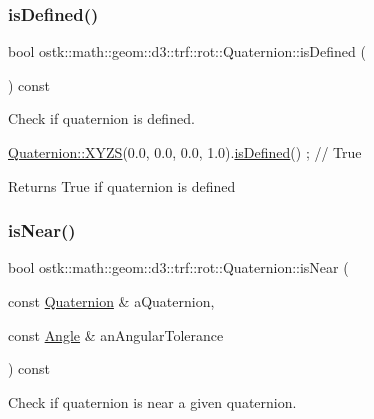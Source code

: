 \subsubsection{\texorpdfstring{is\+Defined()}{isDefined()}}
{\footnotesize\ttfamily bool ostk\+::math\+::geom\+::d3\+::trf\+::rot\+::\+Quaternion\+::is\+Defined (\begin{DoxyParamCaption}{ }\end{DoxyParamCaption}) const}



Check if quaternion is defined. 


\begin{DoxyCode}
\hyperlink{classostk_1_1math_1_1geom_1_1d3_1_1trf_1_1rot_1_1_quaternion_ac57ea57a4033622ed1389101b2e58c76}{Quaternion::XYZS}(0.0, 0.0, 0.0, 1.0).\hyperlink{classostk_1_1math_1_1geom_1_1d3_1_1trf_1_1rot_1_1_quaternion_a4d605d7242ef08aa841ab41df4e06a17}{isDefined}() ; \textcolor{comment}{// True}
\end{DoxyCode}


\begin{DoxyReturn}{Returns}
True if quaternion is defined 
\end{DoxyReturn}
\mbox{\label{classostk_1_1math_1_1geom_1_1d3_1_1trf_1_1rot_1_1_quaternion_abb1535e6e8cfbe38dd7ce4e153374962}} 
\subsubsection{\texorpdfstring{is\+Near()}{isNear()}}
{\footnotesize\ttfamily bool ostk\+::math\+::geom\+::d3\+::trf\+::rot\+::\+Quaternion\+::is\+Near (\begin{DoxyParamCaption}\item[{const \hyperlink{classostk_1_1math_1_1geom_1_1d3_1_1trf_1_1rot_1_1_quaternion}{Quaternion} \&}]{a\+Quaternion,  }\item[{const \hyperlink{classostk_1_1math_1_1geom_1_1_angle}{Angle} \&}]{an\+Angular\+Tolerance }\end{DoxyParamCaption}) const}



Check if quaternion is near a given quaternion. 


